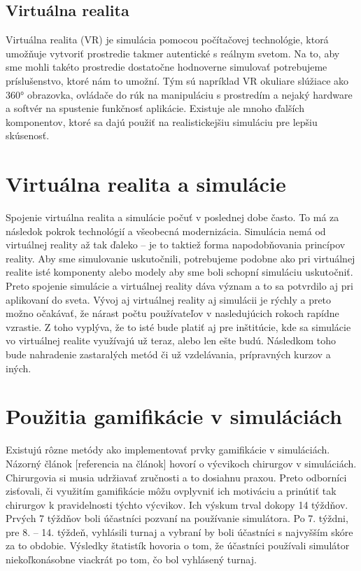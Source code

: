 \documentclass[10pt,slovak,a4paper]{article}
\begin{document}
\subsection{Virtuálna realita} \label{Gamification:virtual_reality}

Virtuálna realita (VR) je simulácia pomocou počítačovej technológie, ktorá umožňuje vytvoriť prostredie takmer autentické s reálnym svetom. Na to, aby sme mohli takéto prostredie dostatočne hodnoverne simulovať potrebujeme príslušenstvo, ktoré nám to umožní. Tým sú napríklad VR okuliare slúžiace ako 360° obrazovka, ovládače do rúk na manipuláciu s prostredím a nejaký hardware a softvér na spustenie funkčnosť aplikácie. Existuje ale mnoho ďalších komponentov, ktoré sa dajú použiť na realistickejšiu simuláciu pre lepšiu skúsenosť. 


\section{Virtuálna realita a simulácie} \label{Simulations}

Spojenie virtuálna realita a simulácie počuť v poslednej dobe často. To má za následok pokrok technológií a všeobecná modernizácia. Simulácia nemá od virtuálnej reality až tak ďaleko – je to taktiež forma napodobňovania princípov reality. Aby sme simulovanie uskutočnili, potrebujeme podobne ako pri virtuálnej realite isté komponenty alebo modely aby sme boli schopní simuláciu uskutočniť. Preto spojenie simulácie a virtuálnej reality dáva význam a to sa potvrdilo aj pri aplikovaní do sveta. Vývoj aj virtuálnej reality aj simulácii je rýchly a preto možno očakávať, že nárast počtu používateľov v nasledujúcich rokoch rapídne vzrastie. Z toho vyplýva, že to isté bude platiť aj pre inštitúcie, kde sa simulácie vo virtuálnej realite využívajú už teraz, alebo len ešte budú. Následkom toho bude nahradenie zastaralých metód či už vzdelávania, prípravných kurzov a iných. 


\section{Použitia gamifikácie v simuláciách} \label{Uses}

Existujú rôzne metódy ako implementovať prvky gamifikácie v simuláciách. Názorný článok [referencia na článok] hovorí o výcvikoch chirurgov v simuláciách. Chirurgovia si musia udržiavať zručnosti a to dosiahnu praxou. Preto odborníci zisťovali, či využitím gamifikácie môžu ovplyvniť ich motiváciu a prinútiť tak chirurgov k pravidelnosti týchto výcvikov. Ich výskum trval  dokopy 14 týždňov. Prvých 7 týždňov boli účastníci pozvaní na používanie simulátora. Po 7. týždni, pre 8. – 14. týždeň, vyhlásili turnaj a vybraní by boli účastníci s najvyšším skóre za to obdobie. Výsledky štatistík hovoria o tom, že účastníci používali simulátor niekoľkonásobne viackrát po tom, čo bol vyhlásený turnaj. 
\end{document}
